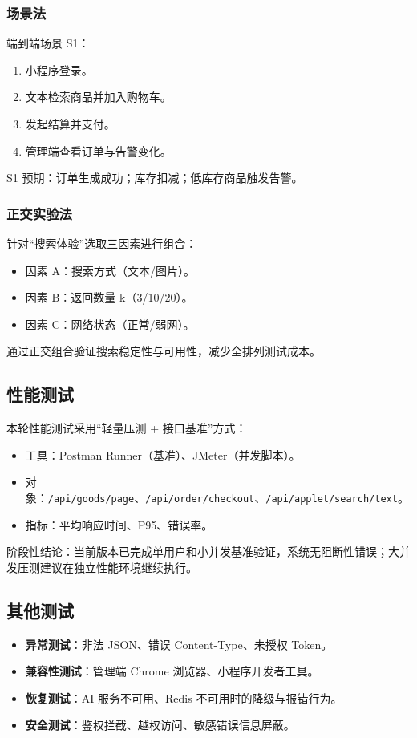 \subsubsection{场景法}
端到端场景 S1：
\begin{enumerate}[leftmargin=2em]
  \item 小程序登录。
  \item 文本检索商品并加入购物车。
  \item 发起结算并支付。
  \item 管理端查看订单与告警变化。
\end{enumerate}

S1 预期：订单生成成功；库存扣减；低库存商品触发告警。

\subsubsection{正交实验法}
针对“搜索体验”选取三因素进行组合：
\begin{itemize}[leftmargin=2em]
  \item 因素 A：搜索方式（文本/图片）。
  \item 因素 B：返回数量 k（3/10/20）。
  \item 因素 C：网络状态（正常/弱网）。
\end{itemize}

通过正交组合验证搜索稳定性与可用性，减少全排列测试成本。

\subsection{性能测试}

本轮性能测试采用“轻量压测 + 接口基准”方式：
\begin{itemize}[leftmargin=2em]
  \item 工具：Postman Runner（基准）、JMeter（并发脚本）。
  \item 对象：\texttt{/api/goods/page}、\texttt{/api/order/checkout}、\texttt{/api/applet/search/text}。
  \item 指标：平均响应时间、P95、错误率。
\end{itemize}

阶段性结论：当前版本已完成单用户和小并发基准验证，系统无阻断性错误；大并发压测建议在独立性能环境继续执行。

\subsection{其他测试}
\begin{itemize}[leftmargin=2em]
  \item \textbf{异常测试}：非法 JSON、错误 Content-Type、未授权 Token。
  \item \textbf{兼容性测试}：管理端 Chrome 浏览器、小程序开发者工具。
  \item \textbf{恢复测试}：AI 服务不可用、Redis 不可用时的降级与报错行为。
  \item \textbf{安全测试}：鉴权拦截、越权访问、敏感错误信息屏蔽。
\end{itemize}


